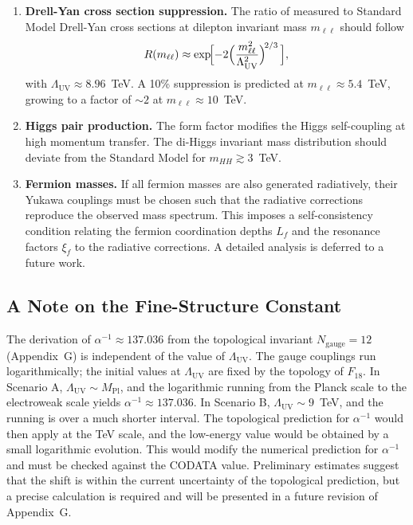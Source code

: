 \documentclass[12pt,a4paper]{article}
\newcommand{\Mpl}{M_{\mathrm{Pl}}}
\newcommand{\LUV}{\Lambda_{\mathrm{UV}}}
\theoremstyle{remark}
\begin{document}
	\begin{enumerate}[label=(\arabic*)]
		\item \textbf{Drell-Yan cross section suppression.}  The ratio of measured to Standard Model Drell-Yan cross sections at dilepton invariant mass \(m_{\ell\ell}\) should follow
		\[
		R(m_{\ell\ell}) \approx \exp\!\Bigl[-2\Bigl(\frac{m_{\ell\ell}^2}{\LUV^2}\Bigr)^{\!2/3}\,\Bigr],
		\]
		with \(\LUV \approx 8.96\)~TeV.  A 10\% suppression is predicted at \(m_{\ell\ell} \approx 5.4\)~TeV, growing to a factor of \(\sim 2\) at \(m_{\ell\ell} \approx 10\)~TeV.
		
		\item \textbf{Higgs pair production.}  The form factor modifies the Higgs self-coupling at high momentum transfer.  The di-Higgs invariant mass distribution should deviate from the Standard Model for \(m_{HH} \gtrsim 3\)~TeV.
		
		\item \textbf{Fermion masses.}  If all fermion masses are also generated radiatively, their Yukawa couplings must be chosen such that the radiative corrections reproduce the observed mass spectrum.  This imposes a self-consistency condition relating the fermion coordination depths \(L_f\) and the resonance factors \(\xi_f\) to the radiative corrections.  A detailed analysis is deferred to a future work.
	\end{enumerate}
	
	\subsection{A Note on the Fine-Structure Constant}
	
	The derivation of \(\alpha^{-1} \approx 137.036\) from the topological invariant \(N_{\mathrm{gauge}} = 12\) (Appendix~G) is independent of the value of \(\LUV\).  The gauge couplings run logarithmically; the initial values at \(\LUV\) are fixed by the topology of \(F_{18}\).  In Scenario A, \(\LUV \sim \Mpl\), and the logarithmic running from the Planck scale to the electroweak scale yields \(\alpha^{-1} \approx 137.036\).  In Scenario B, \(\LUV \sim 9\)~TeV, and the running is over a much shorter interval.  The topological prediction for \(\alpha^{-1}\) would then apply at the TeV scale, and the low-energy value would be obtained by a small logarithmic evolution.  This would modify the numerical prediction for \(\alpha^{-1}\) and must be checked against the CODATA value.  Preliminary estimates suggest that the shift is within the current uncertainty of the topological prediction, but a precise calculation is required and will be presented in a future revision of Appendix~G.
	
\end{document}

